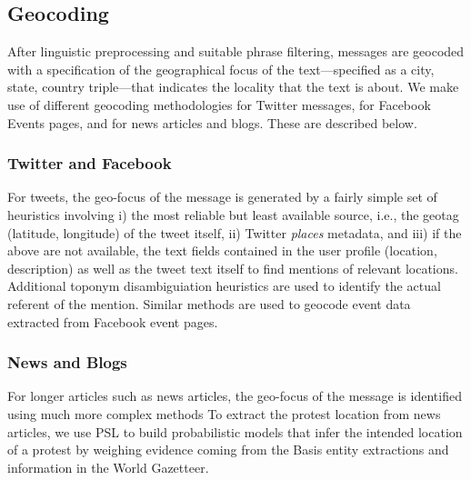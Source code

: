 \subsection{Geocoding}
\label{subsection:geocoding}
After linguistic preprocessing and suitable phrase filtering,
messages are geocoded with a
specification of the geographical focus of the text---specified as a
city, state, country triple---that indicates the locality that the
text is about. We make use of different geocoding methodologies
for Twitter messages, for Facebook Events pages, and for news articles and blogs.
These are described below.

\subsubsection{Twitter and Facebook}
For tweets, the geo-focus of the message is generated by a fairly
simple set of heuristics involving i)
the most reliable but least
available source, i.e., the geotag (latitude, longitude) of the tweet itself,
ii) Twitter {\it places} metadata, and iii) if the above are not
available, the text fields 
contained in
the user profile (location, description) as well as the tweet text
itself to find mentions of relevant locations.  Additional toponym disambiguiation heuristics are used to
identify the actual referent of the mention.
Similar methods are used to geocode event data extracted from 
Facebook event pages.  

\subsubsection{News and Blogs}
For longer articles such as news articles, the geo-focus of the message is identified using much more complex methods
To extract the protest location from news articles, we use PSL to build probabilistic models that infer the intended
location of a protest by 
weighing evidence coming from the Basis entity extractions and
information in the World Gazetteer. 

